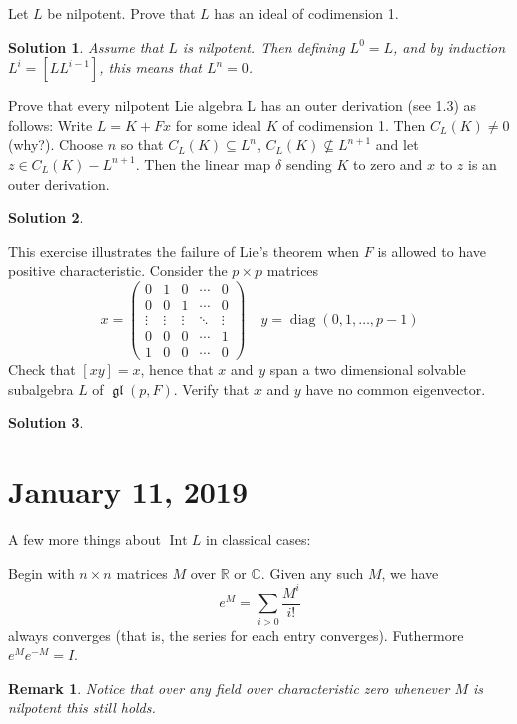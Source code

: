 \documentclass[12pt]{article}
\newenvironment{hwprob}[1]
{\renewcommand{\theprob}{#1}%
 \addtocounter{thm}{-1}%
 \begin{prob}}
{\end{prob}}
\theoremstyle{nonumberbreak}
\newtheorem{sol}{Solution}
\theoremstyle{changebreak}
\theoremstyle{nonumberbreak}
\theoremstyle{change}
\newtheorem{rmk}[thm]{Remark}
\newcommand*{\R}{
\mathbb{R}
}
\newcommand*{\C}{
\mathbb{C}
}
\DeclareMathOperator{\gl}{\mathfrak{gl}}
\DeclareMathOperator{\Int}{Int}
\DeclareMathOperator{\diag}{diag}
\begin{document}
\begin{hwprob}{3.8}
	Let $L$ be nilpotent. Prove that $L$ has an ideal of codimension 1.
\end{hwprob}
\begin{sol}
	Assume that $L$ is nilpotent. Then defining $L^0=L$, and by induction $L^i=[LL^{i-1}]$, this 
	means that $L^n=0$.
\end{sol}

\begin{hwprob}{3.9}
	Prove that every nilpotent Lie algebra L has an outer derivation (see 1.3) as follows: Write $L=K+Fx$
	for some ideal $K$ of codimension 1. Then $C_L(K)\ne 0$ (why?). Choose $n$ so that $C_L(K)\subseteq L^n$,
	$C_L(K)\not\subseteq L^{n+1}$ and let $z\in C_L(K)-L^{n+1}$. Then the linear map $\delta$ sending $K$ to zero
	and $x$ to $z$ is an outer derivation.
\end{hwprob}
\begin{sol}

\end{sol}

\begin{hwprob}{4.3}
	This exercise illustrates the failure of Lie's theorem when $F$ is allowed to have positive characteristic.
	Consider the $p\times p$ matrices
	\[x=\begin{pmatrix} 
		0 & 1 & 0 & \cdots & 0\\
		0 & 0 & 1 & \cdots & 0\\
		\vdots & \vdots & \vdots & \ddots & \vdots\\
		0 & 0 & 0 & \cdots & 1\\
		1 & 0 & 0 & \cdots & 0
	\end{pmatrix}\quad y=\diag(0,1,\dots, p-1)\]
	Check that $[xy]=x$, hence that $x$ and $y$ span a two dimensional solvable subalgebra $L$ of $\gl(p,F)$. Verify that $x$ and $y$ have no common eigenvector.
\end{hwprob}
\begin{sol}

\end{sol}
\newpage

\section{January 11, 2019}
A few more things about $\Int L$ in classical cases:

Begin with $n\times n$ matrices $M$ over $\R$ or $\C$. Given any such $M$, we have
\[e^M=\sum_{i>0}\frac{M^i}{i!}\]
always converges (that is, the series for each entry converges). Futhermore $e^Me^{-M}=I$.
\begin{rmk}
	Notice that over \textit{any} field over characteristic zero whenever $M$ is nilpotent 
	this still holds.
\end{rmk}
\end{document}
